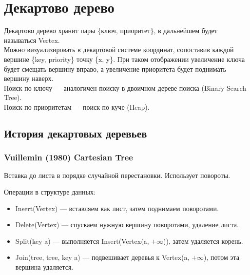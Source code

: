 \documentclass[12pt, a4paper]{article}
\begin{document}
    \section{Декартово дерево}
    Декартово дерево хранит пары \{ключ, приоритет\}, в дальнейшем будет называться Vertex.\\
    Можно визуализировать в декартовой системе координат, сопоставив каждой вершине \{key, priority\} точку \{x, y\}. При таком отображении увеличение ключа будет смещать вершину вправо, а увеличение приоритета будет поднимать вершину наверх.\\
    Поиск по ключу --- аналогичен поиску в двоичном дереве поиска (Binary Search Tree).\\
    Поиск по приоритетам --- поиск по куче (Heap).
    \subsection{История декартовых деревьев}
    \subsubsection{Vuillemin (1980) Cartesian Tree}
    Вставка до листа в порядке случайной перестановки. Использует повороты.
    \begin{center}
        Операции в структуре данных:
    \end{center}
    \begin{itemize}
        \item Insert(Vertex) --- вставляем как лист, затем поднимаем поворотами.
        \item Delete(Vertex) --- спускаем нужную вершину поворотами, удаление листа.
        \item Split(key a) --- выполняется Insert\big(Vertex(a, $+\infty$)\big), затем удаляется корень.
        \item Join(tree, tree, key a) --- подвешивает деревья к Vertex(a, $+\infty$), потом эта вершина удаляется.
    \end{itemize}
\end{document}
